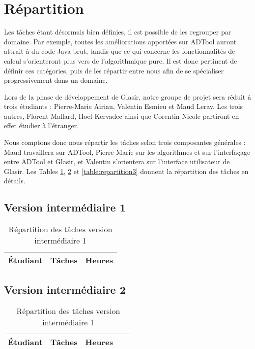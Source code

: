 \section{Répartition}
	\label{sec:repartition}

	Les tâches étant désormais bien définies, il est possible de les regrouper par domaine. Par exemple, toutes les améliorations apportées sur ADTool auront attrait à du code Java brut, tandis que ce qui concerne les fonctionnalités de calcul s'orienteront plus vers de l'algorithmique pure. Il est donc pertinent de définir ces catégories, puis de les répartir entre nous afin de se \og spécialiser \fg{} progressivement dans un domaine.
	
	Lors de la phase de développement de Glasir, notre groupe de projet sera réduit à trois étudiants : Pierre-Marie {\sc Airiau}, Valentin {\sc Esmieu} et Maud {\sc Leray}. Les trois autres, Florent {\sc Mallard}, Hoel {\sc Kervadec} ainsi que Corentin {\sc Nicole} partiront en effet étudier à l'étranger.
	
	Nous comptons donc nous répartir les tâches selon trois composantes générales : Maud travaillera sur ADTool, Pierre-Marie sur les algorithmes et sur l'interfaçage entre ADTool et Glasir, et Valentin s'orientera sur l'interface utilisateur de Glasir. Les {\sc Tables} \ref{table:repartition1}, \ref{table:repartition2} et \ref{table:repartition3} donnent la répartition des tâches en détails.
		
		\subsection{Version intermédiaire 1}
		\begin{table}[h]
			\centering
			\begin{tabular}{|c|r|c|}
				\hline
				\textbf{Étudiant} & \textbf{Tâches} & \textbf{Heures} \\
				\hline

			\end{tabular}
			\caption{Répartition des tâches version intermédiaire 1}
			\label{table:repartition1}
		\end{table}	
		
		\subsection{Version intermédiaire 2}
		\begin{table}[h]
			\centering
			\begin{tabular}{|c|r|l|c|r|}
				\hline
				\textbf{Étudiant} & \textbf{Tâches} & \textbf{Heures} \\
				\hline

			\end{tabular}
			\caption{Répartition des tâches version intermédiaire 1}
			\label{table:repartition2}
		\end{table}	
		
